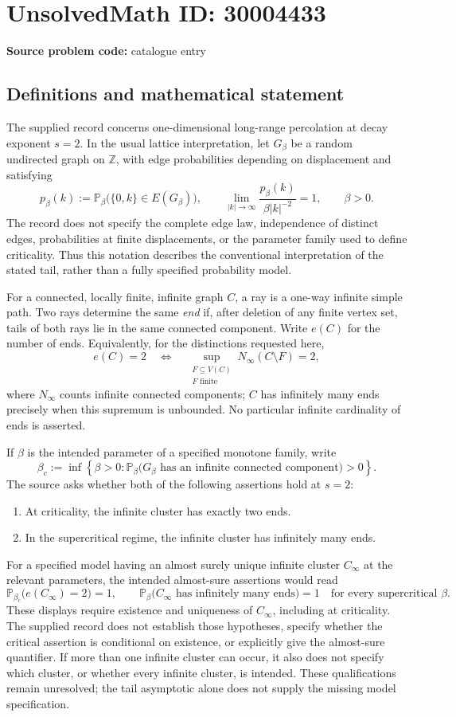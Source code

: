\documentclass[11pt]{article}
\newcommand{\Z}{\mathbb{Z}}
\newcommand{\F}{\mathbb{F}}
\begin{document}
\section*{UnsolvedMath ID: 30004433}
\textbf{Source problem code:} catalogue entry
\subsection{Definitions and mathematical statement}
The supplied record concerns one-dimensional long-range percolation at decay exponent \(s=2\). In the usual lattice interpretation, let \(G_\beta\) be a random undirected graph on \(\Z\), with edge probabilities depending on displacement and satisfying
\[
 p_\beta(k):=\mathbb P_\beta\bigl(\{0,k\}\in E(G_\beta)\bigr),\qquad
 \lim_{|k|\to\infty}\frac{p_\beta(k)}{\beta |k|^{-2}}=1,
 \qquad \beta>0.
\]
The record does not specify the complete edge law, independence of distinct edges, probabilities at finite displacements, or the parameter family used to define criticality. Thus this notation describes the conventional interpretation of the stated tail, rather than a fully specified probability model.

For a connected, locally finite, infinite graph \(C\), a ray is a one-way infinite simple path. Two rays determine the same \emph{end} if, after deletion of any finite vertex set, tails of both rays lie in the same connected component. Write \(e(C)\) for the number of ends. Equivalently, for the distinctions requested here,
\[
 e(C)=2\quad\Longleftrightarrow\quad
 \sup_{\substack{F\subseteq V(C)\\F\text{ finite}}}N_\infty(C\setminus F)=2,
\]
where \(N_\infty\) counts infinite connected components; \(C\) has infinitely many ends precisely when this supremum is unbounded. No particular infinite cardinality of ends is asserted.

If \(\beta\) is the intended parameter of a specified monotone family, write
\[
 \beta_c:=\inf\left\{\beta>0:
 \mathbb P_\beta\bigl(G_\beta\text{ has an infinite connected component}\bigr)>0\right\}.
\]
The source asks whether both of the following assertions hold at \(s=2\):
\begin{enumerate}
\item At criticality, the infinite cluster has exactly two ends.
\item In the supercritical regime, the infinite cluster has infinitely many ends.
\end{enumerate}
For a specified model having an almost surely unique infinite cluster \(C_\infty\) at the relevant parameters, the intended almost-sure assertions would read
\[
 \mathbb P_{\beta_c}\bigl(e(C_\infty)=2\bigr)=1,
 \qquad
 \mathbb P_\beta\bigl(C_\infty\text{ has infinitely many ends}\bigr)=1
 \quad\text{for every supercritical }\beta.
\]
These displays require existence and uniqueness of \(C_\infty\), including at criticality. The supplied record does not establish those hypotheses, specify whether the critical assertion is conditional on existence, or explicitly give the almost-sure quantifier. If more than one infinite cluster can occur, it also does not specify which cluster, or whether every infinite cluster, is intended. These qualifications remain unresolved; the tail asymptotic alone does not supply the missing model specification.
\end{document}
